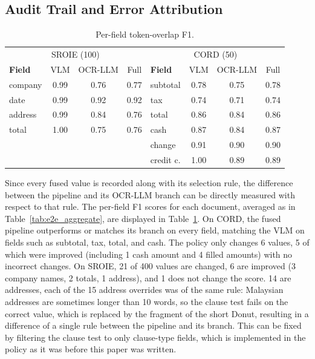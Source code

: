 \documentclass[conference]{IEEEtran}
\begin{document}
\subsection{Audit Trail and Error Attribution}
\label{sec:res_audit}

\begin{table}[t]
\centering
\caption{Per-field token-overlap F1.}
\label{tab:perfield}
\footnotesize
\setlength{\tabcolsep}{2.6pt}
\begin{tabular}{lccc@{\hspace{10pt}}lccc}
\toprule
\multicolumn{4}{c}{SROIE (100)} & \multicolumn{4}{c}{CORD (50)} \\
\textbf{Field} & VLM & OCR-LLM & Full & \textbf{Field} & VLM & OCR-LLM & Full \\
\midrule
company & 0.99 & 0.76 & 0.77 & subtotal & 0.78 & 0.75 & 0.78 \\
date    & 0.99 & 0.92 & 0.92 & tax      & 0.74 & 0.71 & 0.74 \\
address & 0.99 & 0.84 & 0.76 & total    & 0.86 & 0.84 & 0.86 \\
total   & 1.00 & 0.75 & 0.76 & cash     & 0.87 & 0.84 & 0.87 \\
        &      &      &      & change   & 0.91 & 0.90 & 0.90 \\
        &      &      &      & credit c. & 1.00 & 0.89 & 0.89 \\
\bottomrule
\end{tabular}
\end{table}

Since every fused value is recorded along with its selection rule, the difference between the pipeline and its OCR-LLM branch can be directly measured with respect to that rule. The per-field F1 scores for each document, averaged as in Table~\ref{tab:e2e_aggregate}, are displayed in Table~\ref{tab:perfield}. On CORD, the fused pipeline outperforms or matches its branch on every field, matching the VLM on fields such as subtotal, tax, total, and cash. The policy only changes 6 values, 5 of which were improved (including 1 cash amount and 4 filled amounts) with no incorrect changes. On SROIE, 21 of 400 values are changed, 6 are improved (3 company names, 2 totals, 1 address), and 1 does not change the score. 14 are addresses, each of the 15 address overrides was of the same rule: Malaysian addresses are sometimes longer than 10 words, so the clause test fails on the correct value, which is replaced by the fragment of the short Donut, resulting in a difference of a single rule between the pipeline and its branch. This can be fixed by filtering the clause test to only clause-type fields, which is implemented in the policy as it was before this paper was written.
\end{document}
